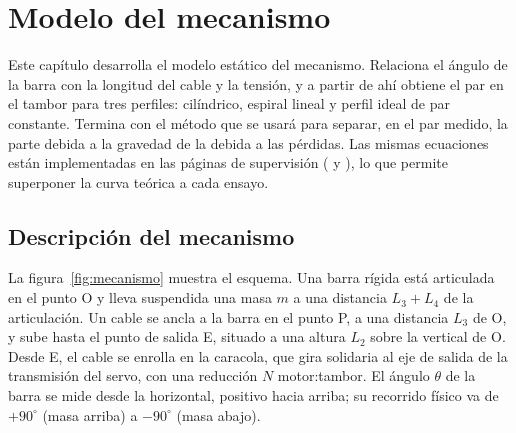 \chapter{Modelo del mecanismo}
\label{chap:modelo}

Este capítulo desarrolla el modelo estático del mecanismo. Relaciona el ángulo de la barra con la
longitud del cable y la tensión, y a partir de ahí obtiene el par en el tambor para tres perfiles:
cilíndrico, espiral lineal y perfil ideal de par constante. Termina con el método que se usará
para separar, en el par medido, la parte debida a la gravedad de la debida a las pérdidas. Las
mismas ecuaciones están implementadas en las páginas de supervisión
( y ), lo que permite superponer la curva
teórica a cada ensayo.

\section{Descripción del mecanismo}

La figura~\ref{fig:mecanismo} muestra el esquema. Una barra rígida está articulada en el punto O y
lleva suspendida una masa $m$ a una distancia $L_3+L_4$ de la articulación. Un cable se ancla a la
barra en el punto P, a una distancia $L_3$ de O, y sube hasta el punto de salida E, situado a una
altura $L_2$ sobre la vertical de O. Desde E, el cable se enrolla en la caracola, que gira solidaria
al eje de salida de la transmisión del servo, con una reducción $N$ motor:tambor. El ángulo
$\theta$ de la barra se mide desde la horizontal, positivo hacia arriba; su recorrido físico va de
$+90^\circ$ (masa arriba) a $-90^\circ$ (masa abajo).

